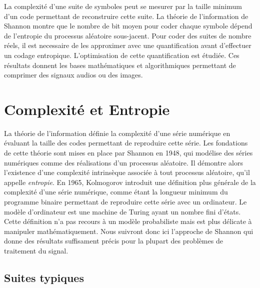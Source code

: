 La complexit\'e d'une suite de symboles
peut se mesurer par la taille minimum d'un code
permettant de reconstruire cette suite.
La th\'eorie de l'information de Shannon montre que le nombre
de bit moyen pour coder chaque symbole d\'epend de l'entropie
du processus al\'eatoire sous-jacent.
Pour coder des suites de nombre r\'eels, il est necessaire
de les approximer avec une quantification avant d'effectuer
un codage entropique.
L'optimisation de cette quantification est \'etudi\'ee.
Ces r\'esultats donnent les bases math\'ematiques
et algorithmiques permettant de
comprimer des signaux audios ou des images.

\section{Complexit\'e et Entropie}

La th\'eorie de l'information d\'efinie la complexit\'e d'une
s\'erie num\'erique en \'evaluant la taille des codes permettant
de reproduire cette s\'erie. Les fondations de cette th\'eorie
sont mises en place par Shannon en 1948, qui mod\'elise
des s\'eries num\'eriques comme des r\'ealisations d'un processus
al\'eatoire. Il d\'emontre alors
l'existence d'une complexit\'e intrins\`eque associ\'ee \`a tout
processus al\'eatoire, qu'il appelle {\it entropie}.
En 1965, Kolmogorov introduit une d\'efinition plus
g\'en\'erale de la complexit\'e d'une s\'erie num\'erique,
comme \'etant la longueur minimum du programme binaire
permettant de reproduire cette s\'erie avec un ordinateur.
Le mod\`ele d'ordinateur est une machine de Turing ayant un
nombre fini d'\'etats.
Cette d\'efinition n'a pas recours \`a un mod\`ele probabiliste
mais est plus d\'elicate \`a manipuler math\'ematiquement.
Nous suivront donc ici l'approche de Shannon qui donne des
r\'esultats suffisament pr\'ecis pour la plupart des
probl\`emes de traitement du signal.

\subsection{Suites typiques}

